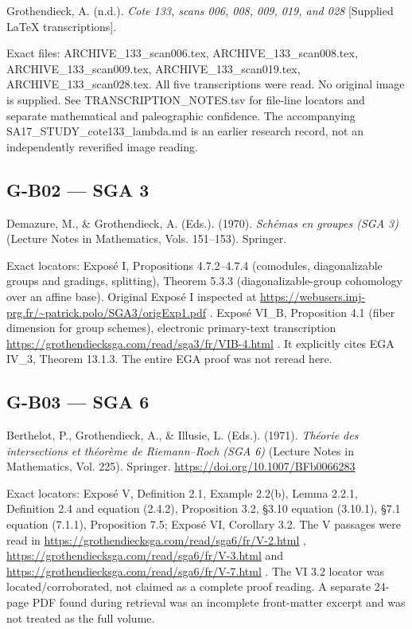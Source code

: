 \documentclass[11pt,a4paper]{article}
\theoremstyle{definition}\newtheorem{definition}{Definition}
\begin{document}
Grothendieck, A. (n.d.). \emph{Cote 133, scans 006, 008, 009, 019, and
028} {[}Supplied LaTeX transcriptions{]}.

Exact files: ARCHIVE\_133\_scan006.tex, ARCHIVE\_133\_scan008.tex,
ARCHIVE\_133\_scan009.tex, ARCHIVE\_133\_scan019.tex,
ARCHIVE\_133\_scan028.tex. All five transcriptions were read. No
original image is supplied. See TRANSCRIPTION\_NOTES.tsv for file-line
locators and separate mathematical and paleographic confidence. The
accompanying SA17\_STUDY\_cote133\_lambda.md is an earlier research
record, not an independently reverified image reading.

\subsection{G-B02 --- SGA 3}\label{g-b02--sga-3}

Demazure, M., \& Grothendieck, A. (Eds.). (1970). \emph{Schémas en
groupes (SGA 3)} (Lecture Notes in Mathematics, Vols. 151--153).
Springer.

Exact locators: Exposé I, Propositions 4.7.2--4.7.4 (comodules,
diagonalizable groups and gradings, splitting), Theorem 5.3.3
(diagonalizable-group cohomology over an affine base). Original Exposé I
inspected at
\url{https://webusers.imj-prg.fr/~patrick.polo/SGA3/origExp1.pdf} .
Exposé VI\_B, Proposition 4.1 (fiber dimension for group schemes),
electronic primary-text transcription
\url{https://grothendiecksga.com/read/sga3/fr/VIB-4.html} . It
explicitly cites EGA IV\_3, Theorem 13.1.3. The entire EGA proof was not
reread here.

\subsection{G-B03 --- SGA 6}\label{g-b03--sga-6}

Berthelot, P., Grothendieck, A., \& Illusie, L. (Eds.). (1971).
\emph{Théorie des intersections et théorème de Riemann--Roch (SGA 6)}
(Lecture Notes in Mathematics, Vol. 225). Springer.
\url{https://doi.org/10.1007/BFb0066283}

Exact locators: Exposé V, Definition 2.1, Example 2.2(b), Lemma 2.2.1,
Definition 2.4 and equation (2.4.2), Proposition 3.2, §3.10 equation
(3.10.1), §7.1 equation (7.1.1), Proposition 7.5; Exposé VI, Corollary
3.2. The V passages were read in
\url{https://grothendiecksga.com/read/sga6/fr/V-2.html} ,
\url{https://grothendiecksga.com/read/sga6/fr/V-3.html} and
\url{https://grothendiecksga.com/read/sga6/fr/V-7.html} . The VI 3.2
locator was located/corroborated, not claimed as a complete proof
reading. A separate 24-page PDF found during retrieval was an incomplete
front-matter excerpt and was not treated as the full volume.
\end{document}
